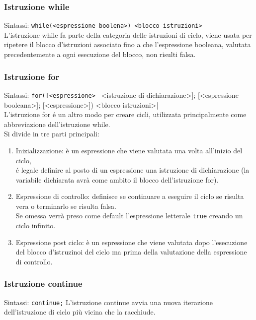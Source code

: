 \subsubsection{Istruzione while}
Sintassi: \lstinline|while(<espressione boolena>) <blocco istruzioni>| \\
L'istruzione while fa parte della categoria delle istruzioni di ciclo, viene usata per ripetere
il blocco d'istruzioni associato fino a che l'espressione booleana, valutata precedentemente a ogni 
esecuzione del blocco, non risulti falsa.

\subsubsection{Istruzione for}
Sintassi: \lstinline|for([<espressione> | <istruzione di dichiarazione>]; [<espressione booleana>]; [<espressione>]) <blocco istruzioni>| \\
L'istruzione for é un altro modo per creare cicli, utilizzata principalmente come abbreviazione
dell'istruzione while. \\
Si divide in tre parti principali:
\begin{enumerate}
    \item {
        Inizializzazione: è un espressione che viene valutata una volta all'inizio del ciclo, \\
        é legale definire al posto di un espressione una istruzione di dichiarazione
        (la variabile dichiarata avrà come ambito il blocco dell'istruzione for).
    }
    \item { 
        Espressione di controllo: definisce se continuare a eseguire il ciclo se risulta vera 
        o terminarlo se risulta falsa. \\
        Se omessa verrà preso come default l'espressione letterale \lstinline|true| creando un ciclo infinito.
    }
    \item {
        Espressione post ciclo: è un espressione che viene valutata dopo l'esecuzione del blocco d'istruzinoi 
        del ciclo ma prima della valutazione della espressione di controllo.
    }
\end{enumerate}

\subsubsection{Istruzione continue}
Sintassi: \lstinline|continue;|
L'istruzione continue avvia una nuova iterazione dell'istruzione di ciclo più vicina che la racchiude.

